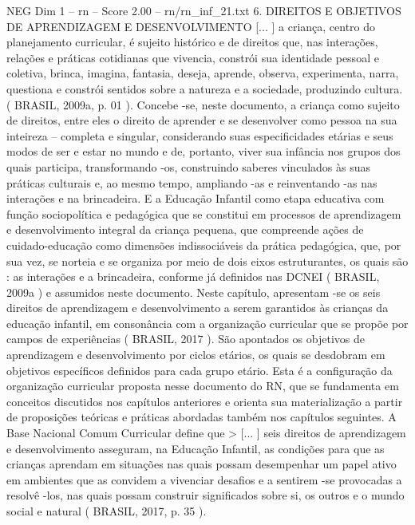 \begin{textsample}{NEG Dim 1 – rn – Score 2.00 – rn/rn\_inf\_21.txt}  \label{ex:f1_neg_024}
6.
DIREITOS E OBJETIVOS DE APRENDIZAGEM E DESENVOLVIMENTO [... ] a criança, centro do planejamento curricular, é sujeito histórico e de direitos que, nas interações, relações e práticas cotidianas que vivencia, constrói sua identidade pessoal e coletiva, brinca, imagina, fantasia, deseja, aprende, observa, experimenta, narra, questiona e constrói sentidos sobre a natureza e a sociedade, produzindo cultura. ( BRASIL, 2009a, p. 01 ).
Concebe -se, neste documento, a criança como sujeito de direitos, entre eles o direito de aprender e se desenvolver como pessoa na sua inteireza – completa e singular, considerando suas especificidades etárias e seus modos de ser e estar no mundo e de, portanto, viver sua infância nos grupos dos quais participa, transformando -os, construindo saberes vinculados às suas práticas culturais e, ao mesmo tempo, ampliando -as e reinventando -as nas interações e na brincadeira.
E a Educação Infantil como etapa educativa com função sociopolítica e pedagógica que se constitui em processos de aprendizagem e desenvolvimento integral da criança pequena, que compreende ações de cuidado-educação como dimensões indissociáveis da prática pedagógica, que, por sua vez, se norteia e se organiza por meio de dois eixos estruturantes, os quais são : as interações e a brincadeira, conforme já definidos nas DCNEI ( BRASIL, 2009a ) e assumidos neste documento.
Neste capítulo, apresentam -se os seis direitos de aprendizagem e desenvolvimento a serem garantidos às crianças da educação infantil, em consonância com a organização curricular que se propõe por campos de experiências ( BRASIL, 2017 ).
São apontados os objetivos de aprendizagem e desenvolvimento por ciclos etários, os quais se desdobram em objetivos específicos definidos para cada grupo etário.
Esta é a configuração da organização curricular proposta nesse documento do RN, que se fundamenta em conceitos discutidos nos capítulos anteriores e orienta sua materialização a partir de proposições teóricas e práticas abordadas também nos capítulos seguintes.
A Base Nacional Comum Curricular define que > [... ] seis direitos de aprendizagem e desenvolvimento asseguram, na Educação Infantil, as condições para que as crianças aprendam em situações nas quais possam desempenhar um papel ativo em ambientes que as convidem a vivenciar desafios e a sentirem -se provocadas a resolvê -los, nas quais possam construir significados sobre si, os outros e o mundo social e natural ( BRASIL, 2017, p. 35 ).

\end{textsample}
